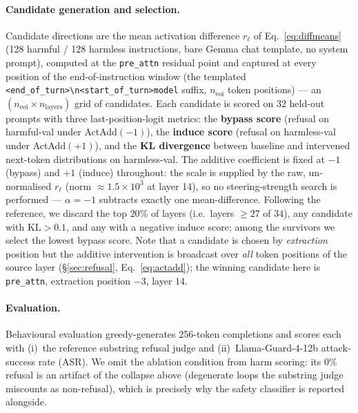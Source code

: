 \paragraph{Candidate generation and selection.} Candidate directions are the mean activation difference $r_\ell$ of Eq.~\ref{eq:diffmeans} (128 harmful / 128 harmless instructions, bare Gemma chat template, no system prompt), computed at the \texttt{pre\_attn} residual point and captured at every position of the end-of-instruction window (the templated \texttt{<end\_of\_turn>\textbackslash n<start\_of\_turn>model} suffix, $n_{\mathrm{eoi}}$ token positions) --- an $(n_{\mathrm{eoi}} \times n_{\mathrm{layers}})$ grid of candidates. Each candidate is scored on 32 held-out prompts with three last-position-logit metrics: the \textbf{bypass score} (refusal on harmful-val under ActAdd$(-1)$), the \textbf{induce score} (refusal on harmless-val under ActAdd$(+1)$), and the \textbf{KL divergence} between baseline and intervened next-token distributions on harmless-val. The additive coefficient is fixed at $-1$ (bypass) and $+1$ (induce) throughout: the scale is supplied by the raw, un-normalised $r_\ell$ (norm $\approx 1.5\times10^{3}$ at layer 14), so no steering-strength search is performed --- $\alpha=-1$ subtracts exactly one mean-difference. Following the reference, we discard the top $20\%$ of layers (i.e.\ layers $\geq 27$ of $34$), any candidate with $\mathrm{KL} > 0.1$, and any with a negative induce score; among the survivors we select the lowest bypass score. Note that a candidate is chosen by \emph{extraction} position but the additive intervention is broadcast over \emph{all} token positions of the source layer (\S\ref{sec:refusal}, Eq.~\ref{eq:actadd}); the winning candidate here is \texttt{pre\_attn}, extraction position $-3$, layer $14$.

\paragraph{Evaluation.} Behavioural evaluation greedy-generates 256-token completions and scores each with (i)~the reference substring refusal judge and (ii)~Llama-Guard-4-12b attack-success rate (ASR). We omit the ablation condition from harm scoring: its 0\% refusal is an artifact of the collapse above (degenerate loops the substring judge miscounts as non-refusal), which is precisely why the safety classifier is reported alongside.

